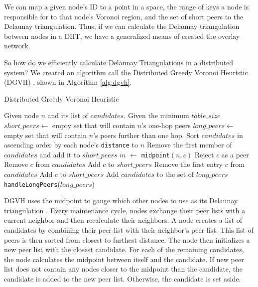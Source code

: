 \documentclass[11pt,conference]{IEEEtran}
\begin{document}
We can map a given node's ID to a point in a space, the range of keys a node is responsible for to that node's Voronoi region, and the set of short peers to the Delaunay triangulation.
Thus, if we can calculate the Delaunay triangulation between nodes in a DHT, we have a generalized means of created the overlay network.


So how do we efficiently calculate Delaunay Triangulations in a distributed system?
We created an algorithm call the Distributed Greedy Voronoi Heuristic (DGVH) \cite{dgvh}, shown in Algorithm \ref{alg:dgvh}.


\begin{algorithm} %
	\caption{Distributed Greedy Voronoi Heuristic}
	\label{alg:dgvh}
	\begin{algorithmic}[1]  %
		\STATE Given node $n$ and its list of $candidates$.
		\STATE Given the minimum $table\_size$
		\STATE $short\_peers \leftarrow$ empty set that will contain $n$'s one-hop peers
		\STATE $long\_peers \leftarrow$ empty set that will contain $n$'s peers further than one hop.
		\STATE Sort $candidates$ in ascending order by each node's \texttt{distance} to $n$
		\STATE Remove the first member of $candidates$ and add it to $short\_peers$
			\STATE $m$ $ \leftarrow $ \texttt{midpoint}$( n, c )$
				\STATE Reject $c$ as a peer
			\ELSE
				\STATE Remove $c$ from $candidates$
				\STATE Add $c$ to $short\_peers$
			\ENDIF
		\ENDFOR
			\STATE Remove the first entry $c$ from $candidates$
			\STATE Add $c$ to $short\_peers$
		\ENDWHILE
		\STATE Add $candidates$ to the set of $long\_peers$	
		\STATE \texttt{handleLongPeers}($long\_peers$)
	\end{algorithmic}
\end{algorithm} 

DGVH uses the midpoint to gauge which other nodes to use as its Delaunay triangulation \cite{dgvh}.
Every maintenance cycle, nodes exchange their peer lists with a current neighbor and then recalculate their neighbors.  
A node creates a list of candidates by combining their peer list with  their neighbor's peer list.
This list of peers is then sorted from closest to furthest distance.
The node then initializes a new peer list with the closest candidate.
For each of the remaining candidates, the node calculates the midpoint between itself and the candidate.
If new peer list does not contain any nodes closer to the midpoint than the candidate, the candidate is added to the new peer list.
Otherwise, the candidate is set aside.
\end{document}
